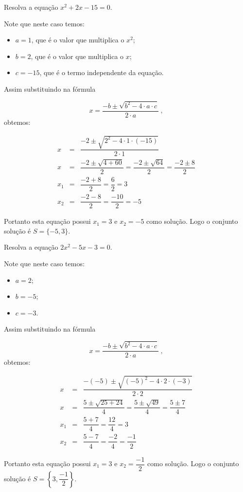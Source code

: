  \begin{exem}
  Resolva a equação $x^2+2x-15= 0$.

 Note que neste caso temos:
  \begin{itemize}
  \item $a= 1$, que é o valor que multiplica o $x^2$;
  \item $b= 2$, que é o valor que multiplica o $x$;
  \item $c= -15$, que é o termo independente da equação.
  \end{itemize}
  Assim substituindo na fórmula

\begin{equation}
x = \dfrac{-b \pm \sqrt{b^2 - 4 \cdot a \cdot c}}{2 \cdot a} \ ,
\end{equation}
 obtemos:

 \begin{eqnarray*}
 x &=& \dfrac{-2 \pm \sqrt{2^2 - 4 \cdot 1 \cdot (-15)}}{2 \cdot 1} \\
 x &=& \dfrac{-2 \pm \sqrt{4 + 60}}{2}= \dfrac{-2 \pm \sqrt{64}}{2}= \dfrac{-2 \pm 8}{2} \\
 x_1 &=& \dfrac{-2 + 8}{2}= \dfrac{6}{2}= 3 \\
 x_2 &=& \dfrac{-2 - 8}{2}= \dfrac{-10}{2}= -5
 \end{eqnarray*}

 Portanto esta equação possui $x_1= 3$ e $x_2= -5$ como solução. Logo o conjunto solução é $S= \{-5, 3\}$.
 \end{exem}
 
 \begin{exem}
 Resolva a equação $2x^2 - 5x - 3= 0$.

 Note que neste caso temos:
  \begin{itemize}
  \item $a= 2$;
  \item $b= -5$;
  \item $c= -3$.
  \end{itemize}
  Assim substituindo na fórmula

\begin{equation}
x = \dfrac{-b \pm \sqrt{b^2 - 4 \cdot a \cdot c}}{2 \cdot a} \ ,
\end{equation}
 obtemos:

 \begin{eqnarray*}
 x &=& \dfrac{-(-5) \pm \sqrt{(-5)^2 - 4 \cdot 2 \cdot (-3)}}{2 \cdot 2} \\
 x &=& \dfrac{5 \pm \sqrt{25 + 24}}{4}= \dfrac{5 \pm \sqrt{49}}{4}= \dfrac{5 \pm 7}{4} \\
 x_1 &=& \dfrac{5 + 7}{4}= \dfrac{12}{4}= 3 \\
 x_2 &=& \dfrac{5 - 7}{4}= \dfrac{-2}{4}= \dfrac{-1}{2}
 \end{eqnarray*}

 Portanto esta equação possui $x_1= 3$ e $x_2= \dfrac{-1}{2}$ como solução. Logo o conjunto solução é $S= \left\{3, \dfrac{-1}{2}\right\}$.
 \end{exem}
 
